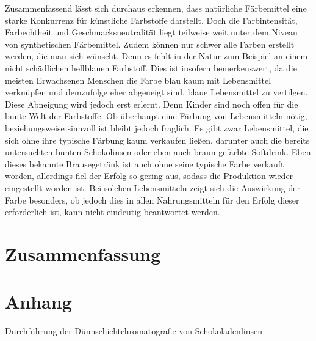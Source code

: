 \documentclass[11pt]{scrreprt}
\begin{document}
Zusammenfassend lässt sich durchaus erkennen, dass natürliche Färbemittel eine starke Konkurrenz für künstliche Farbstoffe darstellt. Doch die Farbintensität, Farbechtheit und Geschmacksneutralität liegt teilweise weit unter dem Niveau von synthetischen Färbemittel. Zudem können nur schwer alle Farben erstellt werden, die man sich wünscht. Denn es fehlt in der Natur zum Beispiel an einem nicht schädlichen hellblauen Farbstoff. Dies ist insofern bemerkenswert, da die meisten Erwachsenen Menschen die Farbe blau kaum mit Lebensmittel verknüpfen und demzufolge eher abgeneigt sind, blaue Lebensmittel zu vertilgen. Diese Abneigung wird jedoch erst erlernt. Denn Kinder sind noch offen für die bunte Welt der Farbstoffe.
Ob überhaupt eine Färbung von Lebensmitteln nötig, beziehungsweise sinnvoll ist bleibt jedoch fraglich. Es gibt zwar Lebensmittel, die sich ohne ihre typische Färbung kaum verkaufen ließen, darunter auch die bereits untersuchten bunten Schokolinsen oder eben auch braun gefärbte Softdrink. Eben dieses bekannte Brausegetränk ist auch ohne seine typische Farbe verkauft worden, allerdings fiel der Erfolg so gering aus, sodass die Produktion wieder eingestellt worden ist. Bei solchen Lebensmitteln zeigt sich die Auswirkung der Farbe besonders, ob jedoch dies in allen Nahrungsmitteln für den Erfolg dieser erforderlich ist, kann nicht eindeutig beantwortet werden.


\chapter {Zusammenfassung}




\chapter{Anhang}
 Durchführung der Dünnschichtchromatografie von Schokoladenlinsen
 
\end{document}
